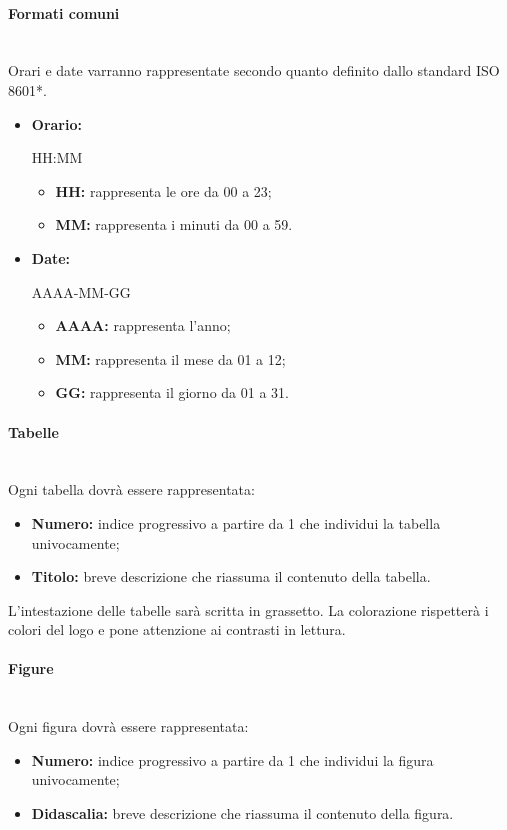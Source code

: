 \documentclass[11pt,a4paper]{article}
\begin{document}
	\paragraph{Formati comuni}
	\noindent \\ 
	Orari e date varranno rappresentate secondo quanto definito dallo standard ISO 8601*. 

	\begin{itemize}
	\item \textbf{Orario:} 
	\begin{center}
		HH:MM
	\end{center}
	\begin{itemize}
		\item \textbf{HH:} rappresenta le ore da 00 a 23;
		\item \textbf{MM:} rappresenta i minuti da 00 a 59.
	\end{itemize} 

	\item \textbf{Date:}
	\begin{center}
		AAAA-MM-GG
	\end{center}
	\begin{itemize}
	\item \textbf{AAAA:} rappresenta l'anno;
	\item \textbf{MM:} rappresenta il mese da 01 a 12;
	\item \textbf{GG:} rappresenta il giorno da 01 a 31.
	\end{itemize}

	\end{itemize}
	
	\paragraph{Tabelle}	
\noindent \\		
	Ogni tabella dovrà essere rappresentata:
	\begin{itemize}
	\item \textbf{Numero:} indice progressivo a partire da 1 che individui la tabella univocamente;
	\item \textbf{Titolo:} breve descrizione che riassuma il contenuto della tabella.
	\end{itemize}
L'intestazione delle tabelle sarà scritta in grassetto. La colorazione rispetterà i colori del logo e pone attenzione ai contrasti in lettura.

	
	
	\paragraph{Figure}
\noindent \\	
	Ogni figura dovrà essere rappresentata:
	\begin{itemize}
		\item \textbf{Numero:} indice progressivo a partire da 1 che individui la figura univocamente;
		\item \textbf{Didascalia:} breve descrizione che riassuma il contenuto della figura.
	\end{itemize}
	
\end{document}
